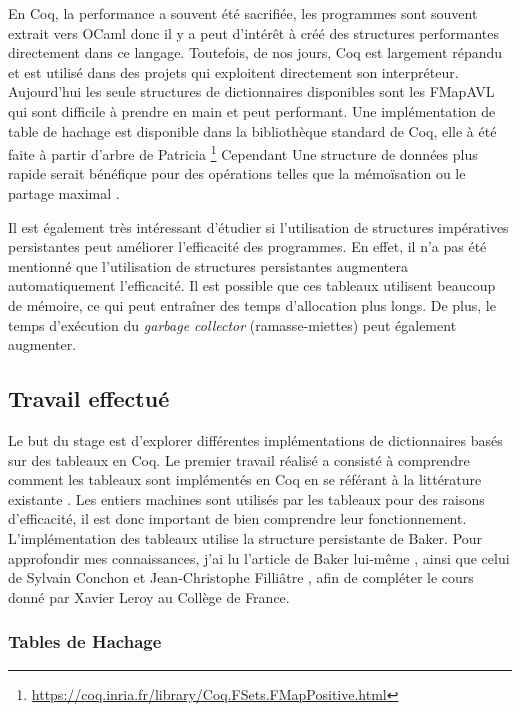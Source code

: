 \documentclass{article}
\begin{document}
  En Coq, la performance a souvent été sacrifiée, les programmes sont souvent
extrait vers OCaml donc il y a peut d'intérêt à créé des structures performantes
directement dans ce langage. Toutefois, de nos jours, Coq est largement répandu
et est utilisé dans des projets qui exploitent directement son interpréteur.
Aujourd'hui les seule structures de dictionnaires disponibles sont les
FMapAVL qui sont difficile à prendre en main et peut performant. Une
implémentation de table de hachage est disponible dans la bibliothèque standard
de Coq, elle à été faite à partir d'arbre de Patricia
\footnote{\url{https://coq.inria.fr/library/Coq.FSets.FMapPositive.html}}
Cependant Une structure de données plus rapide serait bénéfique pour des
opérations telles que la mémoïsation ou le partage maximal
\cite{braibant2014implementing}.

  Il est également très intéressant d'étudier si l'utilisation de structures
impératives persistantes peut améliorer l'efficacité des programmes. En effet,
il n'a pas été mentionné que l'utilisation de structures persistantes augmentera
automatiquement l'efficacité. Il est possible que ces tableaux utilisent
beaucoup de mémoire, ce qui peut entraîner des temps d'allocation plus longs.
De plus, le temps d'exécution du \textit{garbage collector} (ramasse-miettes)
peut également augmenter.

    \newpage
    \subsection{Travail effectué}

Le but du stage est d'explorer différentes implémentations de dictionnaires
basés sur des tableaux en Coq. Le premier travail réalisé a consisté à
comprendre comment les tableaux sont implémentés en Coq en se référant à la
littérature existante \cite{armand2010extending}. Les entiers machines sont
utilisés par les tableaux pour des raisons d'efficacité, il est donc important
de bien comprendre leur fonctionnement. L'implémentation des tableaux utilise
la structure persistante de Baker. Pour approfondir mes connaissances, j'ai lu
l'article de Baker lui-même \cite{baker1991shallow}, ainsi que celui de
Sylvain Conchon et Jean-Christophe Filliâtre \cite{conchon2007persistent}, afin
de compléter le cours donné par Xavier Leroy au Collège de France. 

    \subsubsection{Tables de Hachage}
\end{document}
